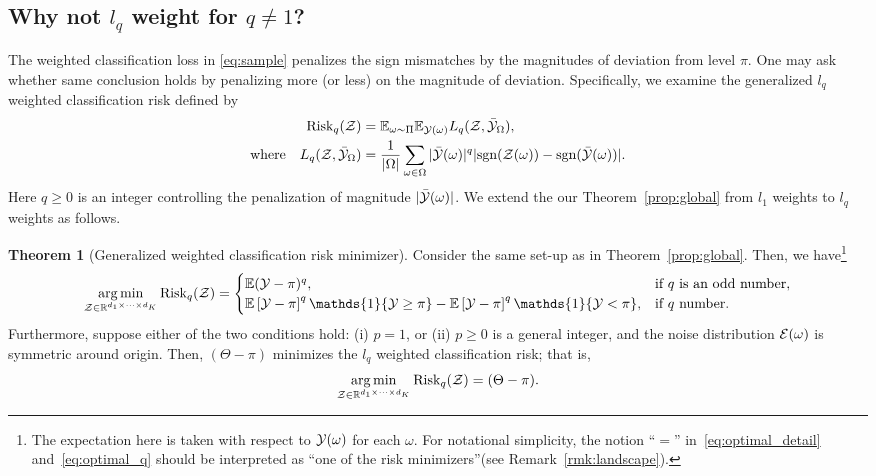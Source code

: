 \documentclass[twoside,11pt]{article}
\theoremstyle{definition}
\newtheorem{thm}{Theorem}
\def\sign{\textup{sgn}}
\def\risk{\textup{Risk}}
\begin{document}
\subsection{Why not $l_q$ weight for $q\neq 1$?}\label{sec:fail}
The weighted classification loss in \eqref{eq:sample} penalizes the sign mismatches by the magnitudes of deviation from level $\pi$. One may ask whether same conclusion holds by penalizing more (or less) on the magnitude of deviation. Specifically, we examine the generalized $l_q$ weighted classification risk defined by
\begin{align}\label{eq:gsample}
      \risk_q(\tZ) &= \mathbb{E}_{\omega\sim \Pi}\mathbb{E}_{\tY(\omega)}L_q(\tZ,\bar\tY_\Omega),\notag\\
 \text{where} \quad  L_q(\tZ,\bar\tY_\Omega) &= \frac{1}{|\Omega|}\sum_{\omega\in\Omega}|\bar\tY(\omega)|^q|\sign(\tZ(\omega))-\sign(\bar \tY(\omega))|.
 \end{align}
Here $q\geq 0$ is an integer controlling the penalization of magnitude $|\bar {\mathcal{Y}}(\omega)|$. We extend the our Theorem~\ref{prop:global} from $l_1$ weights to $l_q$ weights as follows.
\begin{thm}[Generalized weighted classification risk minimizer]\label{prop:global2}
Consider the same set-up as in Theorem~\ref{prop:global}. Then, we have\footnote{The expectation here is taken with respect to $\mathcal{Y}(\omega)$ for each $\omega$. For notational simplicity, the notion ``$=$'' in~\eqref{eq:optimal_detail} and~\eqref{eq:optimal_q} should be interpreted as ``one of the risk minimizers''(see Remark~\ref{rmk:landscape}). }
\begin{align}\label{eq:optimal_detail}
    \argmin_{ \tZ\in\mathbb{R}^{d_1\times \cdots \times d_K}}\textup{Risk}_q(\tZ) = 
    \begin{cases}\mathbb{E}(\tY-\pi)^q,& \text{if $q$ is an odd number},\\ \mathbb{E}\left[\tY-\pi\right]^q\mathds{1}\{\tY\geq \pi\}-\mathbb{E}\left[\tY-\pi\right]^q\mathds{1}\{\tY<\pi\},&\text{if $q$ 
     number.}
    \end{cases}
\end{align}
Furthermore, suppose either of the two conditions hold: (i) $p=1$, or (ii) $p\geq 0$ is a general integer, and the noise distribution $\mathcal{E}(\omega)$ is symmetric around origin. Then, $(\Theta-\pi)$ minimizes the $l_q$ weighted classification risk; that is,
\begin{align}\label{eq:optimal_q}
  \operatorname*{arg\,min}_{ \mathcal{Z}\in\mathbb{R}^{d_1\times \cdots \times d_K}}\textup{Risk}_q(\mathcal{Z}) = (\Theta-\pi).
\end{align}
\end{thm}
\end{document}
